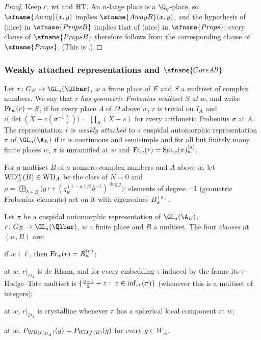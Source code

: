 \begin{proof}
Keep $r$, $\mathrm{wt}$ and $\mathrm{HT}$. An $n$-large place is a $\Q_g$-place, so $\sfname{Away}(x,y)$ implies
$\sfname{AwayB}(x,y)$, and the hypothesis of (nice) in $\sfname{PropsB}$ implies that of (nice) in
$\sfname{Props}$; every clause of $\sfname{PropsB}$ therefore follows from the corresponding clause of
$\sfname{Props}$. (This is .)
\end{proof}

\subsubsection{Weakly attached representations and \texorpdfstring{$\sfname{CoreAll}$}{CoreAll}}

\begin{definition}\label{pf:galred:weak}
Let $r\colon G_E\to\GL_a(\Qlbar)$, $w$ a finite place of $E$ and $S$ a multiset of complex numbers. We say that
$r$ \emph{has geometric Frobenius multiset $S$ at $w$}, and write $\operatorname{Fr}_w(r)=S$, if for every place $A$ of
$\Omega$ above $w$, $r$ is trivial on $I_A$ and $\iota\bigl(\det(X-r(\sigma^{-1}))\bigr)=\prod_S(X-s)$ for every
arithmetic Frobenius $\sigma$ at $A$. The representation $r$ is \emph{weakly attached} to a cuspidal
automorphic representation $\pi$ of $\GL_a(\A_E)$ if it is continuous and semisimple and for all but finitely
many finite places $w$, $\pi$ is unramified at $w$ and $\operatorname{Fr}_w(r)=\operatorname{Sat}_w(\pi)^{(a)}_w$.
\end{definition}

For a multiset $B$ of $a$ nonzero complex numbers and $A$ above $w$, let $\mathrm{WD}^{\mathrm{ur}}_A(B)\in\mathrm{WD}_A$ be the
class of $N=0$ and $\rho=\bigoplus_{b\in B}\bigl(g\mapsto(q_w^{(1-a)/2}b^{-1})^{\deg g}\bigr)$; elements of degree
$-1$ (geometric Frobenius elements) act on it with eigenvalues $B^{(a)}_w$.

\begin{definition}\label{pf:galred:clauses}
Let $\pi$ be a cuspidal automorphic representation of $\GL_a(\A_E)$, $r\colon G_E\to\GL_a(\Qlbar)$, $w$ a finite
place and $B$ a multiset. The four \emph{clauses} at $(w,B)$ are:
\begin{description}[nosep]
\item[(unr)] if $w\nmid\ell$, then $\operatorname{Fr}_w(r)=B^{(a)}_w$;
\item[(dR)] at $w$, $r|_{D_A}$ is de Rham, and for every embedding $\tau$ induced by the frame its $\tau$-Hodge--Tate
  multiset is $\{\frac{a-1}2-z:\ z\in\galredinf_{\iota\tau}(\pi)\}$ (whenever this is a multiset of integers);
\item[(crys)] at $w$, $r|_{D_A}$ is crystalline whenever $\pi$ has a spherical local component at $w$;
\item[(phi)] at $w$, $P_{\mathrm{WD}(r|_{D_A})}(g)=P_{\mathrm{WD}^{\mathrm{ur}}_A(B)}(g)$ for every $g\in W_A$.
\end{description}
\end{definition}

